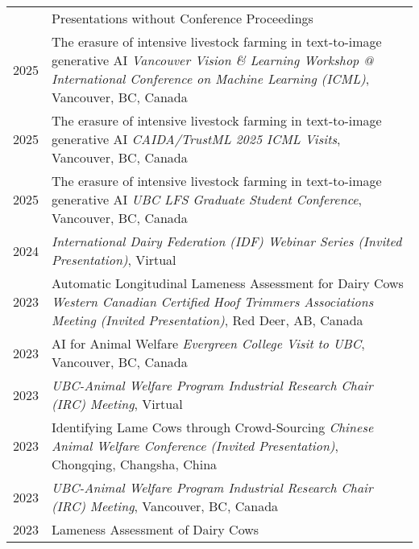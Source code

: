\documentclass[letterpaper, 11pt]{article}
\newcommand{\headingfont}{\Large\color{OliveGreen}}
\newenvironment{SectionTable}[1]{
	\renewcommand*{\arraystretch}{1.7}
	\setlength{\tabcolsep}{10pt}
	\begin{longtable}{Rp{5.2in}} & #1 \\}
{\end{longtable}\vspace{-.3cm}}
\begin{document}
\begin{SectionTable}{\headingfont Presentations without Conference Proceedings}
2025 &
The erasure of intensive livestock farming in text-to-image generative AI \newline
\textit{Vancouver Vision \& Learning Workshop @ International Conference on Machine Learning (ICML)}, Vancouver, BC, Canada \\
2025 &
The erasure of intensive livestock farming in text-to-image generative AI \newline
\textit{CAIDA/TrustML 2025 ICML Visits}, Vancouver, BC, Canada \\
2025 &
The erasure of intensive livestock farming in text-to-image generative AI \newline
\textit{UBC LFS Graduate Student Conference}, Vancouver, BC, Canada \\
2024 &
 \newline
\textit{International Dairy Federation (IDF) Webinar Series (Invited Presentation)}, Virtual \\
2023 &
Automatic Longitudinal Lameness Assessment for Dairy Cows \newline
\textit{Western Canadian Certified Hoof Trimmers Associations Meeting (Invited Presentation)}, Red Deer, AB, Canada \\
2023 &
AI for Animal Welfare \newline
\textit{Evergreen College Visit to UBC}, Vancouver, BC, Canada \\
2023 &
 \newline
\textit{UBC-Animal Welfare Program Industrial Research Chair (IRC) Meeting}, Virtual \\
2023 &
Identifying Lame Cows through Crowd-Sourcing \newline
\textit{Chinese Animal Welfare Conference (Invited Presentation)}, Chongqing, Changsha, China \\
2023 &
 \newline
\textit{UBC-Animal Welfare Program Industrial Research Chair (IRC) Meeting}, Vancouver, BC, Canada \\
2023 &
Lameness Assessment of Dairy Cows \newline

\end{SectionTable}
\end{document}

